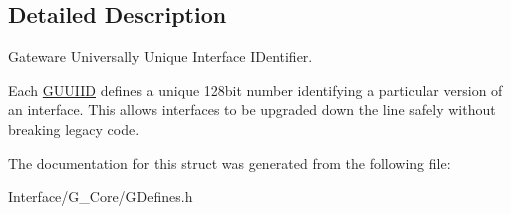 \subsection{Detailed Description}
Gateware Universally Unique Interface I\+Dentifier. 

Each \hyperlink{structGW_1_1GUUIID}{G\+U\+U\+I\+ID} defines a unique 128bit number identifying a particular version of an interface. This allows interfaces to be upgraded down the line safely without breaking legacy code. 

The documentation for this struct was generated from the following file\+:\begin{DoxyCompactItemize}
\item 
Interface/\+G\+\_\+\+Core/G\+Defines.\+h\end{DoxyCompactItemize}

